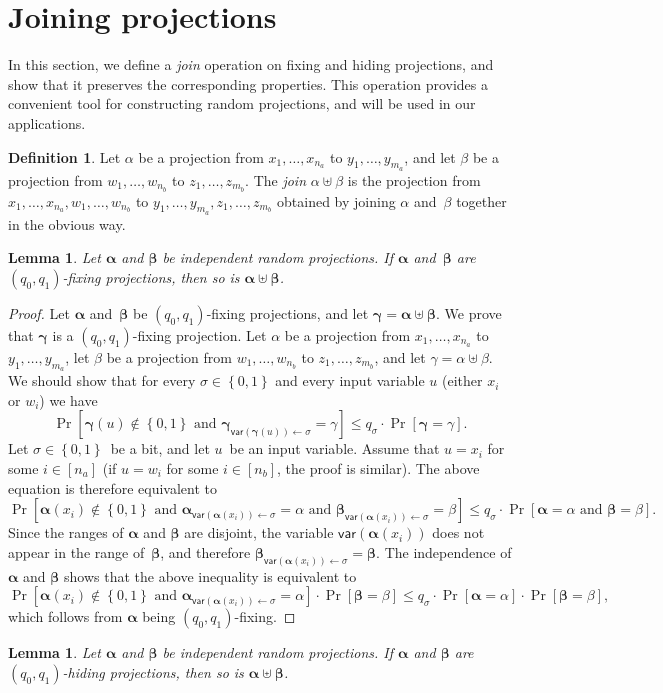 \documentclass[11pt]{article}
\numberwithin{equation}{section}
\newtheorem{lemma}[theorem]{Lemma}
\theoremstyle{definition}
\newtheorem{definition}[theorem]{Definition}
\theoremstyle{plain}
\theoremstyle{definition}\newtheorem{notation}[theorem]{Notation}\theoremstyle{plain}
\newcommand{\B}{\left\{ 0,1 \right \}}
\newcommand{\ga}{\boldsymbol{\alpha}}
\newcommand{\gb}{\boldsymbol{\beta}}
\newcommand{\ggm}{\boldsymbol{\gamma}}
\newcommand{\var}{\mathsf{var}}
\theoremstyle{definition}
\theoremstyle{plain}
\begin{document}
\section{\label{sec:join}Joining projections}

In this section, we define a \emph{join} operation on fixing and hiding
projections, and show that it preserves the corresponding properties.
This operation provides a convenient tool for constructing random
projections, and will be used in our applications.
\begin{definition}
Let $\alpha$ be a projection from $x_{1},\ldots,x_{n_{a}}$ to $y_{1},\ldots,y_{m_{a}}$,
and let $\beta$ be a projection from $w_{1},\ldots,w_{n_{b}}$ to
$z_{1},\ldots,z_{m_{b}}$. The \emph{join} $\alpha\uplus\beta$ is
the projection from $x_{1},\ldots,x_{n_{a}},w_{1},\ldots,w_{n_{b}}$
to $y_{1},\ldots,y_{m_{a}},z_{1},\ldots,z_{m_{b}}$ obtained by joining
$\alpha$ and~$\beta$ together in the obvious way. 
\end{definition}

\begin{lemma}
\label{lemma:concat-fixing}Let $\ga$ and $\gb$ be independent random
projections. If $\ga$ and~$\gb$ are $(q_{0},q_{1})$-fixing projections,
then so is $\ga\uplus\gb$. 
\end{lemma}

\begin{proof}
Let $\ga$ and~$\gb$ be $(q_{0},q_{1})$-fixing projections, and
let $\ggm=\ga\uplus\gb$. We prove that $\ggm$ is a $(q_{0},q_{1})$-fixing
projection. Let $\alpha$ be a projection from $x_{1},\ldots,x_{n_{a}}$
to $y_{1},\ldots,y_{m_{a}}$, let $\beta$ be a projection from $w_{1},\ldots,w_{n_{b}}$
to $z_{1},\ldots,z_{m_{b}}$, and let $\gamma=\alpha\uplus\beta$.
We should show that for every $\sigma\in\B$ and every input variable
$u$ (either $x_{i}$ or $w_{i}$) we have 
\[
\Pr\!\left[\ggm(u)\notin\B\text{ and }\ggm_{\var(\ggm(u))\gets\sigma}=\gamma\right]\leq q_{\sigma}\cdot\Pr\!\left[\ggm=\gamma\right].
\]
Let $\sigma\in\B$~be a bit, and let $u$~be an input variable.
Assume that $u=x_{i}$ for some $i\in\left[n_{a}\right]$ (if $u=w_{i}$
for some $i\in\left[n_{b}\right]$, the proof is similar). The above
equation is therefore equivalent to 
\[
\Pr\!\left[\ga(x_{i})\notin\B\text{ and }\ga_{\var(\ga(x_{i}))\gets\sigma}=\alpha\text{ and }\gb_{\var(\ga(x_{i}))\gets\sigma}=\beta\right]\leq q_{\sigma}\cdot\Pr\!\left[\ga=\alpha\text{ and }\gb=\beta\right].
\]
Since the ranges of $\ga$ and $\gb$ are disjoint, the variable $\var(\ga(x_{i}))$
does not appear in the range of~$\gb$, and therefore $\gb_{\var(\ga(x_{i}))\gets\sigma}=\gb$.
The independence of $\ga$ and $\gb$ shows that the above inequality
is equivalent to 
\[
\Pr\!\left[\ga(x_{i})\notin\B\text{ and }\ga_{\var(\ga(x_{i}))\gets\sigma}=\alpha\right]\cdot\Pr\!\left[\gb=\beta\right]\leq q_{\sigma}\cdot\Pr\!\left[\ga=\alpha\right]\cdot\Pr\!\left[\gb=\beta\right],
\]
which follows from $\ga$ being $(q_{0},q_{1})$-fixing. 
\end{proof}
\begin{lemma}
\label{lemma:concat-hiding}Let $\ga$ and $\gb$ be independent random
projections. If $\ga$ and $\gb$ are $(q_{0},q_{1})$-hiding projections,
then so is $\ga\uplus\gb$. 
\end{lemma}
\end{document}
